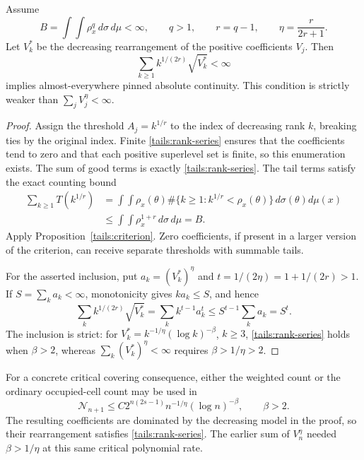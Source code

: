 \begin{theorem}
\label{tails:rank}
Assume
$$
B=\int\!\int\rho_x^q\,d\sigma\,d\mu<\infty,
\qquad q>1,\qquad r=q-1,\qquad\eta=\frac{r}{2r+1}.
$$
Let \(V_k^*\) be the decreasing rearrangement of the positive
coefficients \(V_j\). Then
\begin{equation}\label{tails:rank-series}
\sum_{k\geq1} k^{1/(2r)}\sqrt{V_k^*}<\infty
\end{equation}
implies almost-everywhere pinned absolute continuity. This condition
is strictly weaker than \(\sum_j V_j^\eta<\infty\).
\end{theorem}
\begin{proof}
Assign the threshold \(A_j=k^{1/r}\) to the index of decreasing
rank \(k\), breaking ties by the original index. Finite
\eqref{tails:rank-series} ensures that the coefficients tend to zero
and that each positive superlevel set is finite, so this enumeration
exists. The sum of good terms is exactly
\eqref{tails:rank-series}. The tail terms satisfy the exact counting
bound
\begin{equation}\label{tails:rank-count}
\begin{aligned}
\sum_{k\geq1}T(k^{1/r})
&=\int\!\int\rho_x(\theta)
       \#\{k\geq1:k^{1/r}<\rho_x(\theta)\}
                      \,d\sigma(\theta)d\mu(x)\\
&\leq\int\!\int\rho_x^{1+r}\,d\sigma\,d\mu=B.
\end{aligned}
\end{equation}
Apply Proposition~\ref{tails:criterion}. Zero coefficients, if
present in a larger version of the criterion, can receive separate
thresholds with summable tails.

For the asserted inclusion, put \(a_k=(V_k^*)^\eta\) and
\(t=1/(2\eta)=1+1/(2r)>1\). If \(S=\sum_k a_k<\infty\),
monotonicity gives \(ka_k\leq S\), and hence
$$
\sum_k k^{1/(2r)}\sqrt{V_k^*}
=\sum_k k^{t-1}a_k^t\leq S^{t-1}\sum_k a_k=S^t.
$$
The inclusion is strict: for
\(V_k^*=k^{-1/\eta}(\log k)^{-\beta}\), \(k\geq3\),
\eqref{tails:rank-series} holds when \(\beta>2\), whereas
\(\sum_k(V_k^*)^\eta<\infty\) requires
\(\beta>1/\eta>2\).
\end{proof}

For a concrete critical covering consequence, either the weighted
count or the ordinary occupied-cell count may be used in
\begin{equation}\label{tails:covering}
\mathcal N_{n+1}
\leq C2^{n(2s-1)}n^{-1/\eta}(\log n)^{-\beta},
\qquad \beta>2.
\end{equation}
The resulting coefficients are dominated by the decreasing model in
the proof, so their rearrangement satisfies
\eqref{tails:rank-series}. The earlier sum of \(V_n^\eta\)
needed \(\beta>1/\eta\) at this same critical polynomial rate.

